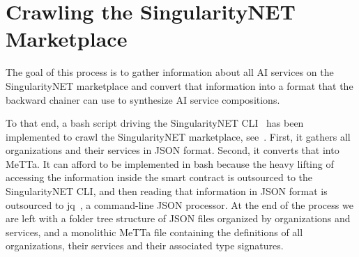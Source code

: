 \documentclass[]{report}
\begin{document}
\section{Crawling the SingularityNET Marketplace}
\label{sec:csnmp}
The goal of this process is to gather information about all AI
services on the SingularityNET marketplace and convert that
information into a format that the backward chainer can use to
synthesize AI service compositions.

To that end, a bash script driving the SingularityNET
CLI~\cite{SNETCLI} has been implemented to crawl the SingularityNET
marketplace, see~\cite{SNETCrawler}.  First, it gathers all
organizations and their services in JSON format.  Second, it converts
that into MeTTa.  It can afford to be implemented in bash because the
heavy lifting of accessing the information inside the smart contract
is outsourced to the SingularityNET CLI, and then reading that
information in JSON format is outsourced to jq~\cite{JQ}, a
command-line JSON processor.  At the end of the process we are left
with a folder tree structure of JSON files organized by organizations
and services, and a monolithic MeTTa file containing the definitions
of all organizations, their services and their associated type
signatures.
\end{document}
